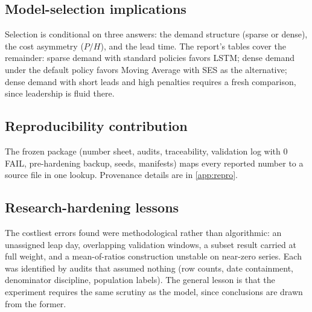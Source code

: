 \subsection{Model-selection implications}
\label{sec:c-select}
Selection is conditional on three answers: the demand structure (sparse or
dense), the cost asymmetry ($P/H$), and the lead time. The report's tables
cover the remainder: sparse demand with standard policies favors LSTM; dense
demand under the default policy favors Moving Average with SES as the
alternative; dense demand with short leads and high penalties requires a
fresh comparison, since leadership is fluid there.

\subsection{Reproducibility contribution}
\label{sec:c-repro}
The frozen package (number sheet, audits, traceability, validation log with
0 FAIL, pre-hardening backup, seeds, manifests) maps every reported number
to a source file in one lookup. Provenance details are in \cref{app:repro}.

\subsection{Research-hardening lessons}
\label{sec:c-harden}
The costliest errors found were methodological rather than algorithmic: an
unassigned leap day, overlapping validation windows, a subset result carried
at full weight, and a mean-of-ratios construction unstable on near-zero
series. Each was identified by audits that assumed nothing (row counts, date
containment, denominator discipline, population labels). The general lesson
is that the experiment requires the same scrutiny as the model, since
conclusions are drawn from the former.
